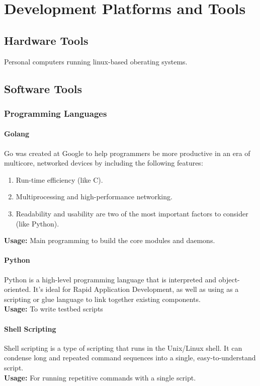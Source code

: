 \chapter{Development Platforms and Tools}
\section{Hardware Tools }
Personal computers running linux-based oberating systems.

\section{Software Tools}
\subsection{Programming Languages}
\subsubsection{Golang}
Go was created at Google to help programmers be more productive in an era of multicore, networked devices by including the following features: 
\begin{enumerate}[itemsep=1pt, topsep=5pt]
    \item Run-time efficiency (like C).
    \item Multiprocessing and high-performance networking.
    \item Readability and usability are two of the most important factors to consider (like Python).
\end{enumerate}
\textbf{Usage:} Main programming to build the core modules and daemons.

\subsubsection{Python}
Python is a high-level programming language that is interpreted and object-oriented. It's ideal for Rapid Application Development, as well as using as a scripting or glue language to link together existing components.
\\
\textbf{Usage:} To write testbed scripts

\subsubsection{Shell Scripting}
Shell scripting is a type of scripting that runs in the Unix/Linux shell.
It can condense long and repeated command sequences into a single, easy-to-understand script.
\\
\textbf{Usage:} For running repetitive commands with a single script.

